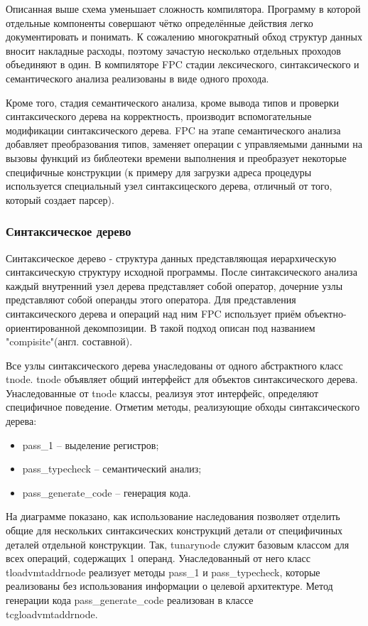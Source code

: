\documentclass{imcs}
\begin{document}
Описанная выше схема уменьшает сложность компилятора. Программу в которой отдельные 
компоненты совершают чётко определённые действия легко документировать и понимать.
К сожалению многократный обход структур данных вносит накладные расходы, поэтому
зачастую несколько отдельных проходов объединяют в один. В компиляторе FPC стадии
лексического, синтаксического и семантического анализа реализованы в виде одного
прохода. 

Кроме того, стадия семантического анализа, кроме вывода типов и проверки синтаксического
дерева на корректность, производит вспомогательные модификации синтаксического дерева.
FPC на этапе семантического анализа добавляет преобразования типов, заменяет операции
с управляемыми данными на вызовы функций из библеотеки времени выполнения и преобразует
некоторые специфичные конструкции (к примеру для загрузки адреса процедуры используется
специальный узел синтаксицеского дерева, отличный от того, который создает парсер).

\subsubsection{Синтаксическое дерево}

Синтаксическое дерево - структура данных представляющая иерархическую синтаксическую
структуру исходной программы\cite{dragonbook}. После синтаксического анализа каждый внутренний узел 
дерева представляет собой оператор, дочерние узлы представляют собой операнды этого
оператора. Для представления синтаксического дерева и операций над ним FPC использует
приём объектно-ориентированной декомпозиции. В \cite{gof} такой подход описан под
названием "compisite"(англ. составной).

Все узлы синтаксического дерева унаследованы от одного абстрактного класс tnode.
tnode объявляет общий интерфейст для объектов синтаксического дерева. Унаследованные
от tnode классы, реализуя этот интерфейс, определяют специфичное поведение. Отметим
методы, реализующие обходы синтаксического дерева:
\begin{itemize}
    \item pass\_1 -- выделение регистров;
    \item pass\_typecheck -- семантический анализ;
    \item pass\_generate\_code -- генерация кода.
\end{itemize}

На диаграмме показано, как использование наследования позволяет отделить общие для 
нескольких синтаксических конструкций детали от специфичиных деталей отдельной конструкции.
Так, tunarynode служит базовым классом для всех операций, содержащих 1 операнд.
Унаследованный от него класс tloadvmtaddrnode реализует методы pass\_1 и pass\_typecheck,
которые реализованы без использования информации о целевой архитектуре. Метод
генерации кода pass\_generate\_code реализован в классе \\ tcgloadvmtaddrnode.
\end{document}
